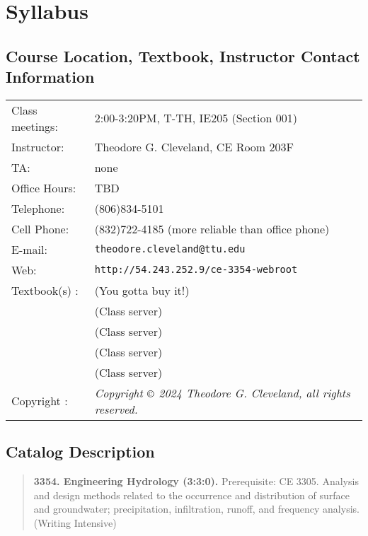 \documentclass[12pt]{article}
\begin{document}
\section*{Syllabus}

\subsection*{{Course Location, Textbook, Instructor Contact Information}}
\begin{tabular}{p{1.5in}p{5.0in}}
Class meetings: &   2:00-3:20PM, T-TH, IE205 (Section 001) \\
Instructor: & Theodore G. Cleveland, CE Room 203F \\
TA: & none \\
Office Hours: & TBD \\%
Telephone: & (806)834-5101 \\
Cell Phone: & (832)722-4185 (more reliable than office phone) \\
E-mail: & \texttt{theodore.cleveland@ttu.edu}\\
Web: & \texttt{http://54.243.252.9/ce-3354-webroot}\\
Textbook(s) : & \cite{Gupta2017} (You gotta buy it!) \\
~ & \cite{CMM1988} (Class server) \\
~ & \cite{Dooge1973} (Class server) \\
~ & \cite{McCuen2002} (Class server) \\
~ & \cite{Cleveland2024} (Class server)\\
Copyright : & \textsl{Copyright $\copyright$ 2024 Theodore G. Cleveland, all rights reserved.} \\
\end{tabular}
\subsection*{{Catalog Description}}
\begin{quote} \textbf{3354. Engineering Hydrology (3:3:0).}  Prerequisite: CE 3305. Analysis and design methods related to the occurrence and distribution of surface and groundwater; precipitation, infiltration, runoff, and frequency analysis. (Writing Intensive)
\end{quote}
\end{document}

